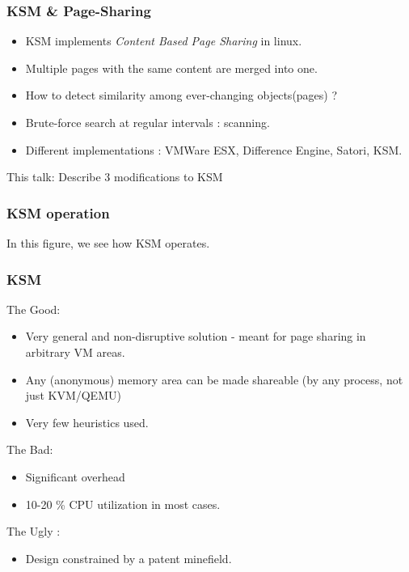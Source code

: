 \documentclass{beamer}
\begin{document}
\begin{frame}
\frametitle{KSM \& Page-Sharing}
\begin{itemize}
  \item \alert{KSM } implements \emph{Content Based Page Sharing} in linux.
  \item Multiple pages with the same content are merged into one.
  \item How to detect similarity among ever-changing objects(pages) ?
  \item Brute-force search at regular intervals : scanning.
  \item Different implementations : VMWare ESX, Difference Engine, Satori, KSM.  
\end{itemize}

\alert{This talk: Describe 3 modifications to KSM }

\end{frame}




\begin{frame}
  \frametitle{KSM operation}
  {In this figure, we see how KSM operates. }
\end{frame}

\begin{frame}
\frametitle{KSM}
\alert{The Good: }  
  \begin{itemize}
  \item Very general and non-disruptive solution - meant for page sharing in arbitrary VM areas.
  \item Any (anonymous) memory area can be made shareable (by any process, not just KVM/QEMU) 
  \item Very few heuristics used.
  \end{itemize}
\alert{The Bad: }
\begin{itemize}
  \item Significant overhead
  \item 10-20 \% CPU utilization in most cases.
\end{itemize}
\alert {The Ugly :}
\begin{itemize}
\item Design constrained by a patent minefield.
\end{itemize}

\end{frame}
\end{document}
